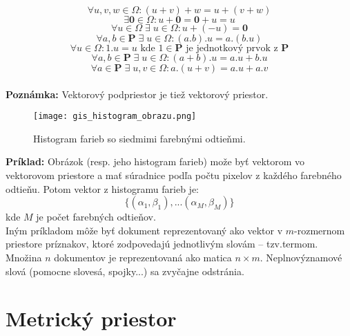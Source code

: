 \documentclass[12pt,oneside]{fithesis2}
\begin{document}
\begin{equation*}
\forall u,v,w \in \Omega : (u + v)+w = u+(v+w) 
\end{equation*}
\begin{equation*}
\exists\mathbf{0} \in \Omega : u+\mathbf{0} = \mathbf{0}+u = u
\end{equation*}
\begin{equation*}
\forall u \in \Omega \; \exists \; u \in \Omega : u+(-u)  = \mathbf{0}
\end{equation*}
\begin{equation*}
\forall a,b \in \mathbf{P} \; \exists \; u \in \Omega : (a.b).u = a.(b.u) 
\end{equation*}
\begin{equation*}
\forall u \in \Omega : 1.u=u  \textrm{ kde } 1 \in \mathbf{P}  \textrm{ je jednotkový prvok z } \mathbf{P} 
\end{equation*}
\begin{equation*}
\forall a,b \in \mathbf{P} \; \exists \;u \in \Omega : (a+b).u = a.u + b.u 
\end{equation*}
\begin{equation*}
\forall a \in \mathbf{P} \; \exists \;u,v \in \Omega : a.(u+v) = a.u + a.v 
\end{equation*} \\
\textbf{Poznámka:} Vektorový podpriestor je tiež vektorový priestor.

\begin{figure}
  \centering
  \texttt{[image: gis\_histogram\_obrazu.png]}
  \caption{Histogram farieb so siedmimi farebnými odtieňmi.}
  \label{fig:triangle}
\end{figure}  

\textbf{Príklad:}
Obrázok (resp. jeho histogram farieb) može byť vektorom vo vektorovom priestore a mať súradnice podľa počtu pixelov z každého farebného odtieňu.
Potom vektor z histogramu farieb je:
\begin{equation}
\{(\alpha_1,\beta_1),...(\alpha_M,\beta_M)\}
\end{equation}
kde $M$ je počet farebných odtieňov. \\
Iným príkladom môže byť dokument reprezentovaný ako
vektor v $m$-rozmernom priestore príznakov, ktoré zodpovedajú jednotlivým slovám – tzv.termom. Množina $n$ dokumentov je reprezentovaná ako matica $n\times m$. Neplnovýznamové slová (pomocne slovesá, spojky...) sa zvyčajne odstránia.


    \section{Metrický priestor}
    
\end{document}
